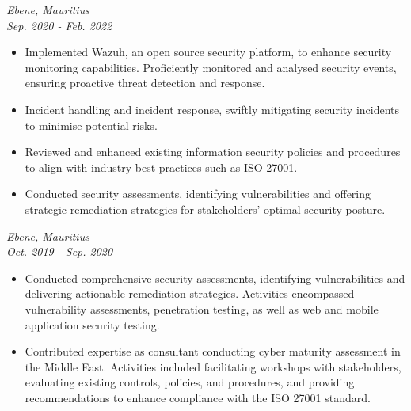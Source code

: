 \documentclass[a4paper, fleqn, oneside]{article}
\begin{document}
\vspace{2em}
{ \hfill \textit{Ebene, Mauritius}} \\
{ \hfill {\textit{Sep. 2020 - Feb. 2022}}}
\begin{itemize}
\item Implemented Wazuh, an open source security platform, to enhance security monitoring capabilities. Proficiently monitored and analysed security events, ensuring proactive threat detection and response.
\item Incident handling and incident response, swiftly mitigating security incidents to minimise potential risks.
\item Reviewed and enhanced existing information security policies and procedures to align with industry best practices such as ISO 27001.
\item Conducted security assessments, identifying vulnerabilities and offering strategic remediation strategies for stakeholders’ optimal security posture.
\end{itemize}

\vspace{2em}
{ \hfill \textit{Ebene, Mauritius}} \\
{ \hfill {\textit{Oct. 2019 - Sep. 2020}}}
\begin{itemize}
\item Conducted comprehensive security assessments, identifying vulnerabilities and delivering actionable remediation strategies. Activities encompassed vulnerability assessments, penetration testing, as well as web and mobile application security testing.
\item Contributed expertise as consultant conducting cyber maturity assessment in the Middle East. Activities included facilitating workshops with stakeholders, evaluating existing controls, policies, and procedures, and providing recommendations to enhance compliance with the ISO 27001 standard.
\end{itemize}
\end{document}
